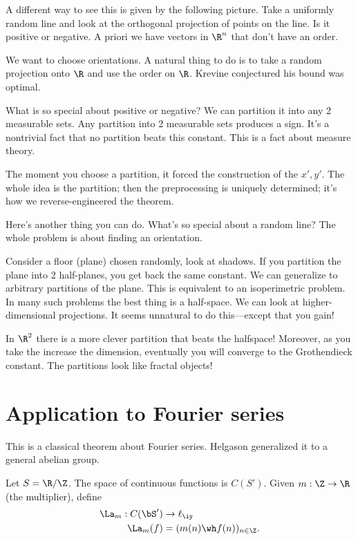 A different way to see this is given by the following picture. Take a uniformly random line and look at the orthogonal projection of points on the line. Is it positive or negative. A priori we have vectors in $\R^n$ that don't have an order. 

We want to choose orientations. A natural thing to do is to take a random projection onto $\R$ and use the order on $\R$. Krevine conjectured his bound was optimal.

What is so special about positive or negative? We can partition it into any 2 measurable sets. Any partition into 2 measurable sets produces a sign. It's a nontrivial fact that no partition beats this constant. This is a fact about measure theory.

The moment you choose a partition, %
it forced the construction of the $x',y'$. %
The whole idea is the partition; then the preprocessing is uniquely determined; it's how we reverse-engineered the theorem.

Here's another thing you can do. What's so special about a random line? The whole problem is about finding an orientation. 

Consider a floor (plane) chosen randomly, look at shadows. If you partition the plane into 2 half-planes, you get back the same constant. We can generalize to arbitrary partitions of the plane. This is equivalent to an isoperimetric problem. In many such problems the best thing is a half-space. We can look at higher-dimensional projections. It seems unnatural to do this---except that you gain!

In $\R^2$ there is a more clever partition that beats the halfspace! Moreover, as you take the increase the dimension, eventually you will converge to the Grothendieck constant. The partitions look like fractal objects!


\section{Application to Fourier series}

This is a classical theorem about Fourier series. %
Helgason generalized it to a general abelian group.

\begin{df}
Let $S=\R/\Z$. The space of continuous functions is $C(S')$. Given $m:\Z\to \R$ (the multiplier), 
define 
\begin{align}
\La_m:C(\bS') &\to \ell_\iy\\
\La_m(f) &= (m(n)\wh f(n))_{n\in \Z}.
\end{align}
\end{df}

